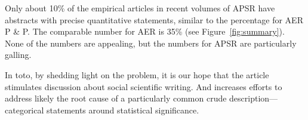 \documentclass[12pt]{article}
\begin{document}
Only about 10\% of the empirical articles in recent volumes of APSR have abstracts with precise quantitative statements, similar to the percentage for AER P \& P. The comparable number for AER is 35\% (see Figure~\ref{fig:summary}). None of the numbers are appealing, but the numbers for APSR are particularly galling. 

In toto, by shedding light on the problem, it is our hope that the article stimulates discussion about social scientific writing. And increases efforts to address likely the root cause of a particularly common crude description---categorical statements around statistical significance. 

\clearpage


\end{document}

